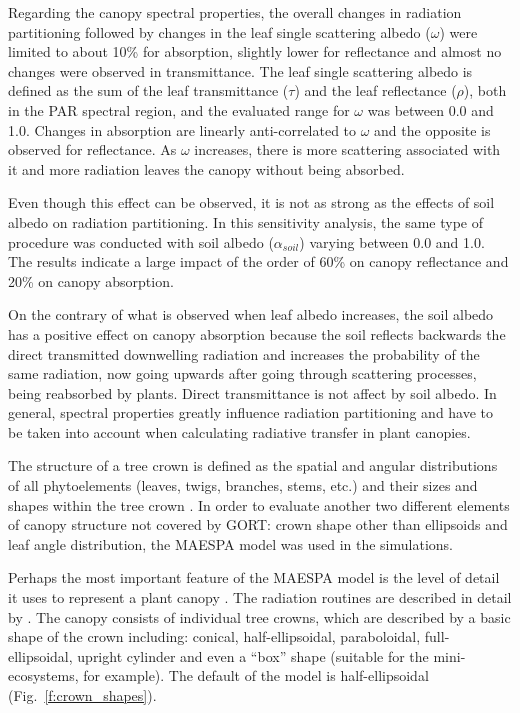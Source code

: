 Regarding the canopy spectral properties, the overall changes in radiation partitioning followed by changes in the leaf single scattering albedo ($\omega$) were limited to about 10\% for absorption, slightly lower for reflectance and almost no changes were observed in transmittance. The leaf single scattering albedo is defined as the sum of the leaf transmittance ($\tau$) and the leaf reflectance ($\rho$), both in the PAR spectral region, and the evaluated range for $\omega$ was between 0.0 and 1.0. Changes in absorption are linearly anti-correlated to $\omega$ and the opposite is observed for reflectance. As $\omega$ increases, there is more scattering associated with it and more radiation leaves the canopy without being absorbed. 

Even though this effect can be observed, it is not as strong as the effects of soil albedo on radiation partitioning. In this sensitivity analysis, the same type of procedure was conducted with soil albedo ($\alpha_{soil}$) varying between 0.0 and 1.0. The results indicate a large impact of the order of 60\% on canopy reflectance and 20\% on canopy absorption. 

On the contrary of what is observed when leaf albedo increases, the soil albedo has a positive effect on canopy absorption because the soil reflects backwards the direct transmitted downwelling radiation and increases the probability of the same radiation, now going upwards after going through scattering processes, being reabsorbed by plants. Direct transmittance is not affect by soil albedo. In general, spectral properties greatly influence radiation partitioning and have to be taken into account when calculating radiative transfer in plant canopies.

The structure of a tree crown is defined as the spatial and angular distributions of all phytoelements (leaves, twigs, branches, stems, etc.) and their sizes and shapes within the tree crown \citep{Wang1990a}. In order to evaluate another two different elements of canopy structure not covered by GORT: crown shape other than ellipsoids and leaf angle distribution, the MAESPA model was used in the simulations. 

Perhaps the most important feature of the MAESPA model is the level of detail it uses to represent a plant canopy \citep{Medlyn2004}. The radiation routines are described in detail by \citet{Wang1990}. The canopy consists of individual tree crowns, which are described by a basic shape of the crown including: conical, half-ellipsoidal, paraboloidal, full-ellipsoidal, upright cylinder and even a “box” shape (suitable for the mini-ecosystems, for example). The default of the model is half-ellipsoidal (Fig.~\ref{f:crown_shapes}).

